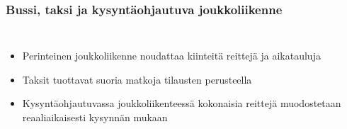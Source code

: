\documentclass{beamer}
\begin{document}
\begin{frame}
  \frametitle{Bussi, taksi ja kysyntäohjautuva joukkoliikenne}   %
  \begin{columns}[c]
  \column{2.5in}  %
  \begin{itemize}
\item
Perinteinen joukkoliikenne noudattaa kiinteitä reittejä ja aikatauluja
\item
Taksit tuottavat suoria matkoja tilausten perusteella
\item
Kysyntäohjautuvassa joukkoliikenteessä kokonaisia reittejä muodostetaan reaaliaikaisesti kysynnän mukaan
\end{itemize}
  \column{2.5in}
  \end{columns}
\end{frame}
    
    
 
\end{document}
